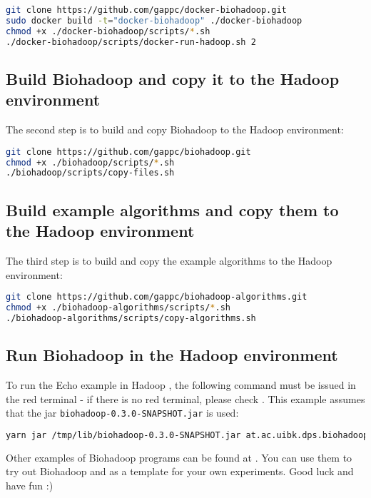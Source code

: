 \begin{lstlisting}[language=bash]
git clone https://github.com/gappc/docker-biohadoop.git
sudo docker build -t="docker-biohadoop" ./docker-biohadoop
chmod +x ./docker-biohadoop/scripts/*.sh
./docker-biohadoop/scripts/docker-run-hadoop.sh 2
\end{lstlisting}

\subsection{Build Biohadoop and copy it to the Hadoop environment}
The second step is to build and copy Biohadoop to the Hadoop environment:

\begin{lstlisting}[language=bash]
git clone https://github.com/gappc/biohadoop.git
chmod +x ./biohadoop/scripts/*.sh
./biohadoop/scripts/copy-files.sh
\end{lstlisting}

\subsection{Build example algorithms and copy them to the Hadoop environment}
The third step is to build and copy the example algorithms to the Hadoop environment:

\begin{lstlisting}[language=bash]
git clone https://github.com/gappc/biohadoop-algorithms.git
chmod +x ./biohadoop-algorithms/scripts/*.sh
./biohadoop-algorithms/scripts/copy-algorithms.sh
\end{lstlisting}

\subsection{Run Biohadoop in the Hadoop environment}
To run the Echo example in Hadoop , the following command must be issued in the red terminal - if there is no red terminal, please check \cite{biohadoop-docker}. This example assumes that the jar \texttt{biohadoop-0.3.0-SNAPSHOT.jar} is used:

\begin{lstlisting}[language=bash]
yarn jar /tmp/lib/biohadoop-0.3.0-SNAPSHOT.jar at.ac.uibk.dps.biohadoop.hadoop.BiohadoopClient /biohadoop/conf/biohadoop-echo.json
\end{lstlisting}

Other examples of Biohadoop programs can be found at \cite{biohadoop-algorithms}. You can use them to try out Biohadoop and as a template for your own experiments. Good luck and have fun :)

